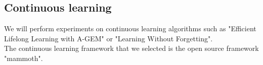 \documentclass{article}
\theoremstyle{plain}
\theoremstyle{definition}
\theoremstyle{remark}
\begin{document}
\subsection{Continuous learning}
We will perform experiments on continuous learning algorithms such as "Efficient Lifelong Learning with A-GEM"\cite{chaudhry2019efficientlifelonglearningagem} or "Learning Without Forgetting"\cite{li2017learningforgetting}. \\
The continuous learning framework that we selected is the open source framework "mammoth"\cite{mammoth}.



\end{document}
